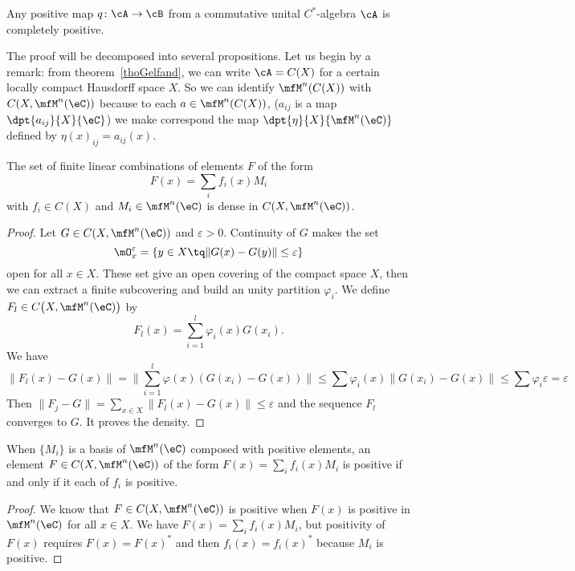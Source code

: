 \begin{proposition}
	Any positive map $q\colon \cA\to \cB$ from a commutative unital $C^*$-algebra $\cA$ is completely positive.
\end{proposition}

The proof will be decomposed into several propositions. Let us begin by a remark: from theorem~\ref{thoGelfand}, we can write $\cA=C(X)$ for a certain locally compact Hausdorff space $X$. So we can identify $\mfM^n(C(X))$ with $C(X,\mfM^n(\eC))$ because to each $a\in\mfM^n(C(X))$, ($a_{ij}$ is a map $\dpt{ a_{ij} }{ X }{ \eC }$) we make correspond the map $\dpt{ \eta }{ X }{ \mfM^n(\eC) }$ defined by $\eta(x)_{ij}=a_{ij}(x)$.


\begin{proposition}
	The set of finite linear combinations of elements $F$ of the form
	\[
		F(x)=\sum_i f_i(x)M_i
	\]
	with $f_i\in C(X)$ and $M_i\in\mfM^n(\eC)$ is dense in $C(X,\mfM^n(\eC))$.
	\label{prop:lencombpart}
\end{proposition}


\begin{proof}
	Let $G\in C(X,\mfM^n(\eC))$ and $\varepsilon>0$. Continuity of $G$ makes the set
	\[
		\mO_x^{\varepsilon}=\{ y\in X\tq \| G(x)-G(y) \|\leq\varepsilon \}
	\]
	open for all $x\in X$. These set give an open covering of the compact space $X$, then we can extract a finite subcovering and build an unity partition $\varphi_i$. We define $F_l\in C\big( X,\mfM^n(\eC) \big)$ by
	\begin{equation} \label{eq:Fllim}
		F_l(x)=\sum_{i=1}^l\varphi_i(x)G(x_i).
	\end{equation}
	We have
	\begin{equation}
		\| F_l(x)-G(x) \|=\| \sum_{i=1}^l\varphi(x)( G(x_i)-G(x) ) \|
		\leq \sum \varphi_i(x)\| G(x_i)-G(x) \|
		\leq \sum\varphi_i\varepsilon
		=\varepsilon
	\end{equation}
	Then $\| F_j-G \|=\sum_{x\in X}\| F_l(x)-G(x) \|\leq\varepsilon$ and the sequence $F_l$ converges to $G$. It proves the density.
\end{proof}


\begin{proposition}
	When $\{ M_i \}$ is a basis of $\mfM^n(\eC)$ composed with positive elements, an element $F\in C(X,\mfM^n(\eC))$ of the form $F(x)=\sum_if_i(x)M_i$ is positive if and only if it each of $f_i$ is positive.
\end{proposition}

\begin{proof}
	We know that $F\in C(X,\mfM^n(\eC))$ is positive when $F(x)$ is positive in $\mfM^n(\eC)$ for all $x\in X$. We have $F(x)=\sum_if_i(x)M_i$, but positivity of $F(x)$ requires $F(x)=F(x)^*$ and then $f_i(x)=f_i(x)^*$ because $M_i$ is positive.

\end{proof}

